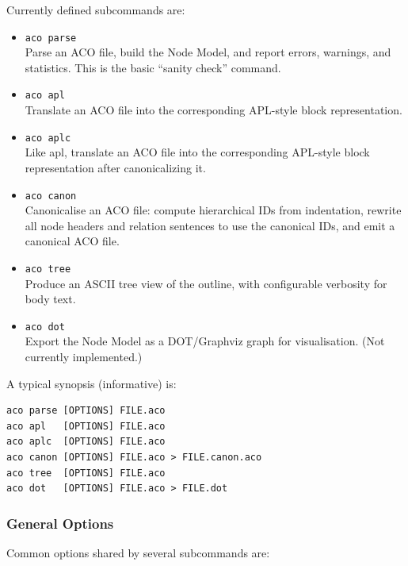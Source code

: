 \documentclass[11pt]{article}
\begin{document}
Currently defined subcommands are:

\begin{itemize}[leftmargin=2em]
  \item \texttt{aco parse} \\
        Parse an ACO file, build the Node Model, and report errors, warnings, and statistics. This is the basic ``sanity check'' command.
  \item \texttt{aco apl} \\
        Translate an ACO file into the corresponding APL-style block representation.
  \item \texttt{aco aplc} \\
        Like apl, translate an ACO file into the corresponding APL-style block representation after canonicalizing it.
  \item \texttt{aco canon} \\
        Canonicalise an ACO file: compute hierarchical IDs from indentation, rewrite all node headers and relation sentences to use the canonical IDs, and emit a canonical ACO file.
  \item \texttt{aco tree} \\
        Produce an ASCII tree view of the outline, with configurable verbosity for body text.
  \item \texttt{aco dot} \\
        Export the Node Model as a DOT/Graphviz graph for visualisation. (Not currently implemented.)
\end{itemize}

A typical synopsis (informative) is:

\begin{verbatim}
aco parse [OPTIONS] FILE.aco
aco apl   [OPTIONS] FILE.aco
aco aplc  [OPTIONS] FILE.aco
aco canon [OPTIONS] FILE.aco > FILE.canon.aco
aco tree  [OPTIONS] FILE.aco
aco dot   [OPTIONS] FILE.aco > FILE.dot
\end{verbatim}

\subsubsection*{General Options}

Common options shared by several subcommands are:
\end{document}
